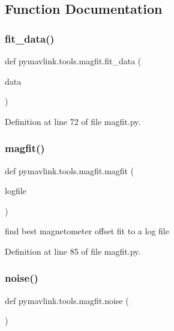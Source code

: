 \subsection{Function Documentation}
\mbox{\label{namespacepymavlink_1_1tools_1_1magfit_a6319a159948ba8c06e42b01fc3ce3ffc}} 
\subsubsection{\texorpdfstring{fit\_data()}{fit\_data()}}
{\footnotesize\ttfamily def pymavlink.\+tools.\+magfit.\+fit\+\_\+data (\begin{DoxyParamCaption}\item[{}]{data }\end{DoxyParamCaption})}



Definition at line 72 of file magfit.\+py.

\mbox{\label{namespacepymavlink_1_1tools_1_1magfit_a91167174e4e89e986413000d1117081c}} 
\subsubsection{\texorpdfstring{magfit()}{magfit()}}
{\footnotesize\ttfamily def pymavlink.\+tools.\+magfit.\+magfit (\begin{DoxyParamCaption}\item[{}]{logfile }\end{DoxyParamCaption})}

\begin{DoxyVerb}find best magnetometer offset fit to a log file\end{DoxyVerb}
 

Definition at line 85 of file magfit.\+py.

\mbox{\label{namespacepymavlink_1_1tools_1_1magfit_a1ac824bd9533f61b3719628394a63f71}} 
\subsubsection{\texorpdfstring{noise()}{noise()}}
{\footnotesize\ttfamily def pymavlink.\+tools.\+magfit.\+noise (\begin{DoxyParamCaption}{ }\end{DoxyParamCaption})}

